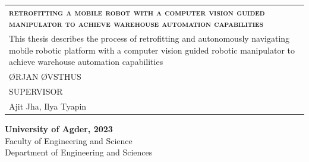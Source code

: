 \begin{titlepage}

\newcommand{\projectTitle}{retrofitting a mobile robot with a computer vision guided manipulator to achieve warehouse automation capabilities}
\newcommand{\projectSubTitlel}{This thesis describes the process of retrofitting and autonomously navigating mobile robotic platform with a computer vision guided robotic manipulator to achieve warehouse automation capabilities}
\newcommand{\authors}{ØRJAN ØVSTHUS}
\newcommand{\supervisor}{Ajit Jha, Ilya Tyapin}
\newcommand{\projectYear}{2023}

\newcommand{\facultyName}{Faculty of Engineering and Science}
\newcommand{\departmentName}{Department of Engineering and Sciences}




\begin{tabular}{p{12cm}}
                                            \\[5cm]
    \LARGE{\textsc{\textbf{\projectTitle}}} \\[1.5cm]
    \projectSubTitlel                       \\[2.5cm]
    \large{\authors}                        \\[9cm]
    \Large{SUPERVISOR}                      \\
    \supervisor
\end{tabular}



\vfill


\textbf{University of Agder, \projectYear} \\
\small{\facultyName \\
\departmentName}
\vspace{1cm}
\end{titlepage}

